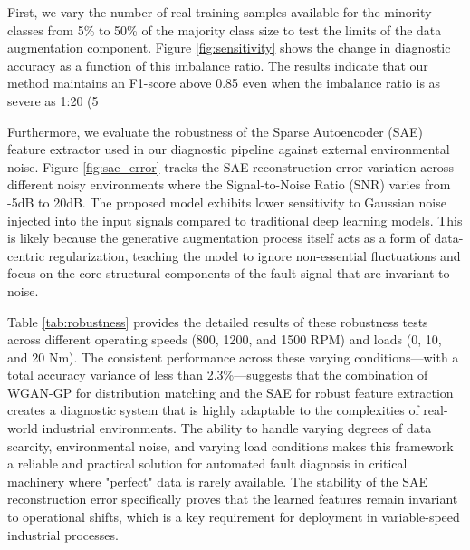 First, we vary the number of real training samples available for the minority classes from 5\% to 50\% of the majority class size to test the limits of the data augmentation component. Figure \ref{fig:sensitivity} shows the change in diagnostic accuracy as a function of this imbalance ratio. The results indicate that our method maintains an F1-score above 0.85 even when the imbalance ratio is as severe as 1:20 (5%

Furthermore, we evaluate the robustness of the Sparse Autoencoder (SAE) feature extractor used in our diagnostic pipeline against external environmental noise. Figure \ref{fig:sae_error} tracks the SAE reconstruction error variation across different noisy environments where the Signal-to-Noise Ratio (SNR) varies from -5dB to 20dB. The proposed model exhibits lower sensitivity to Gaussian noise injected into the input signals compared to traditional deep learning models. This is likely because the generative augmentation process itself acts as a form of data-centric regularization, teaching the model to ignore non-essential fluctuations and focus on the core structural components of the fault signal that are invariant to noise.

Table \ref{tab:robustness} provides the detailed results of these robustness tests across different operating speeds (800, 1200, and 1500 RPM) and loads (0, 10, and 20 Nm). The consistent performance across these varying conditions—with a total accuracy variance of less than 2.3\%—suggests that the combination of WGAN-GP for distribution matching and the SAE for robust feature extraction creates a diagnostic system that is highly adaptable to the complexities of real-world industrial environments. The ability to handle varying degrees of data scarcity, environmental noise, and varying load conditions makes this framework a reliable and practical solution for automated fault diagnosis in critical machinery where "perfect" data is rarely available. The stability of the SAE reconstruction error specifically proves that the learned features remain invariant to operational shifts, which is a key requirement for deployment in variable-speed industrial processes.
